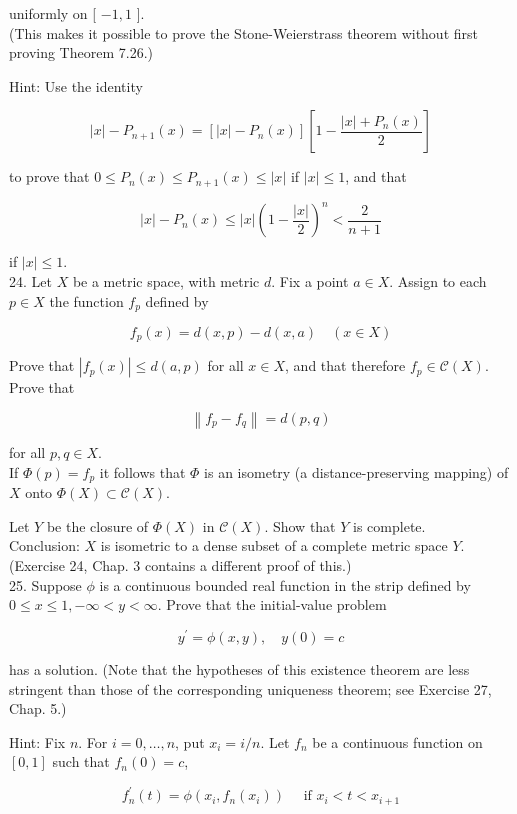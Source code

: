 \documentclass[10pt]{article}
\begin{document}
uniformly on [ $-1,1$ ].\\
(This makes it possible to prove the Stone-Weierstrass theorem without first proving Theorem 7.26.)

Hint: Use the identity

$$
|x|-P_{n+1}(x)=\left[|x|-P_{n}(x)\right]\left[1-\frac{|x|+P_{n}(x)}{2}\right]
$$

to prove that $0 \leq P_{n}(x) \leq P_{n+1}(x) \leq|x|$ if $|x| \leq 1$, and that

$$
|x|-P_{n}(x) \leq|x|\left(1-\frac{|x|}{2}\right)^{n}<\frac{2}{n+1}
$$

if $|x| \leq 1$.\\
24. Let $X$ be a metric space, with metric $d$. Fix a point $a \in X$. Assign to each $p \in X$ the function $f_{p}$ defined by

$$
f_{p}(x)=d(x, p)-d(x, a) \quad(x \in X)
$$

Prove that $\left|f_{p}(x)\right| \leq d(a, p)$ for all $x \in X$, and that therefore $f_{p} \in \mathscr{C}(X)$.\\
Prove that

$$
\left\|f_{p}-f_{q}\right\|=d(p, q)
$$

for all $p, q \in X$.\\
If $\Phi(p)=f_{p}$ it follows that $\Phi$ is an isometry (a distance-preserving mapping) of $X$ onto $\Phi(X) \subset \mathscr{C}(X)$.

Let $Y$ be the closure of $\Phi(X)$ in $\mathscr{C}(X)$. Show that $Y$ is complete.\\
Conclusion: $X$ is isometric to a dense subset of a complete metric space $Y$.\\
(Exercise 24, Chap. 3 contains a different proof of this.)\\
25. Suppose $\phi$ is a continuous bounded real function in the strip defined by $0 \leq x \leq 1,-\infty<y<\infty$. Prove that the initial-value problem

$$
y^{\prime}=\phi(x, y), \quad y(0)=c
$$

has a solution. (Note that the hypotheses of this existence theorem are less stringent than those of the corresponding uniqueness theorem; see Exercise 27, Chap. 5.)

Hint: Fix $n$. For $i=0, \ldots, n$, put $x_{i}=i / n$. Let $f_{n}$ be a continuous function on $[0,1]$ such that $f_{n}(0)=c$,

$$
f_{n}^{\prime}(t)=\phi\left(x_{i}, f_{n}\left(x_{i}\right)\right) \quad \text { if } x_{i}<t<x_{i+1}
$$
\end{document}
